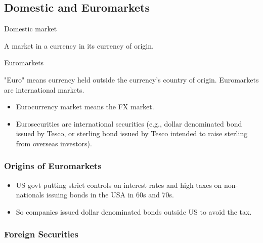 \documentclass[
]{article}
\providecommand{\tightlist}{%
  \setlength{\itemsep}{0pt}\setlength{\parskip}{0pt}}
\newenvironment{env-2d124ec8-9684-4795-b83a-650d2937997a}
{
    \savenotes\tcolorbox[blanker,breakable,left=5pt,borderline west={2pt}{-4pt}{gold}]
}
{
    \endtcolorbox\spewnotes
}
\begin{document}
\hypertarget{domestic-and-euromarkets}{%
\subsection{Domestic and Euromarkets}\label{domestic-and-euromarkets}}

\begin{env-2d124ec8-9684-4795-b83a-650d2937997a}

Domestic market

A market in a currency in its currency of origin.

\end{env-2d124ec8-9684-4795-b83a-650d2937997a}

\begin{env-2d124ec8-9684-4795-b83a-650d2937997a}

Euromarkets

"Euro" means currency held outside the currency's country of origin.
Euromarkets are international markets.

\end{env-2d124ec8-9684-4795-b83a-650d2937997a}

\begin{itemize}
\tightlist
\item
  Eurocurrency market means the FX market.
\item
  Eurosecurities are international securities (e.g., dollar denominated
  bond issued by Tesco, or sterling bond issued by Tesco intended to
  raise sterling from overseas investors).
\end{itemize}

\hypertarget{origins-of-euromarkets}{%
\subsubsection{Origins of Euromarkets}\label{origins-of-euromarkets}}

\begin{itemize}
\tightlist
\item
  US govt putting strict controls on interest rates and high taxes on
  non-nationals issuing bonds in the USA in 60s and 70s.
\item
  So companies issued dollar denominated bonds outside US to avoid the
  tax.
\end{itemize}

\hypertarget{foreign-securities}{%
\subsubsection{Foreign Securities}\label{foreign-securities}}
\end{document}
